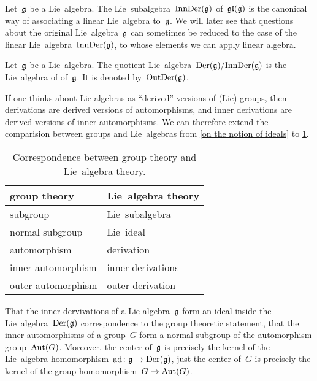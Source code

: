 \begin{remark}
  Let~$\mathfrak{g}$ be a Lie~algebra.
  The Lie~subalgebra~$\operatorname{InnDer}(\mathfrak{g})$ of~$\mathfrak{gl}(\mathfrak{g})$ is the canonical way of associating a linear Lie~algebra to~$\mathfrak{g}$.
  We will later see that questions about the original Lie~algebra~$\mathfrak{g}$ can sometimes be reduced to the case of the linear Lie~algebra~$\operatorname{InnDer}(\mathfrak{g})$, to whose elements we can apply linear algebra.
\end{remark}


\begin{definition}
  Let~$\mathfrak{g}$ be a Lie~algebra.
  The quotient Lie~algebra~$\operatorname{Der}(\mathfrak{g}) / {\operatorname{InnDer}(\mathfrak{g})}$ is the Lie~algebra of  of~$\mathfrak{g}$.
  It is denoted by~$\operatorname{OutDer}(\mathfrak{g})$.
\end{definition}


\begin{remark}
  If one thinks about Lie algebras as \enquote{derived} versions of (Lie) groups, then derivations are derived versions of automorphisms, and inner derivations are derived versions of inner automorphisms.
  We can therefore extend the comparision between groups and Lie~algebras from \cref{on the notion of ideals} to \cref{correspondence between groups and lie algebras}.
  \begin{table}
    \centering
    \begin{tabular}{ll}
      \toprule
      group theory
      &
      Lie~algebra theory
      \\
      \midrule
      subgroup
      &
      Lie~subalgebra
      \\
      normal subgroup
      &
      Lie~ideal
      \\
      automorphism
      &
      derivation
      \\
      inner automorphism
      &
      inner derivations
      \\
      outer automorphism
      &
      outer derivation
      \\
      \bottomrule
    \end{tabular}
    \caption{Correspondence between group theory and Lie~algebra theory.}
    \label{correspondence between groups and lie algebras}
  \end{table}

  That the inner dervivations of a Lie algebra~$\mathfrak{g}$ form an ideal inside the Lie~algebra~$\operatorname{Der}(\mathfrak{g})$ correspondence to the group theoretic statement, that the inner automorphisms of a group~$G$ form a normal subgroup of the automorphism group~$\operatorname{Aut}(G)$.
  Moreover, the center of~$\mathfrak{g}$ is precisely the kernel of the Lie~algebra homomorphism~$\ad \colon \glie \to \Der(\glie)$, just the center of~$G$ is precisely the kernel of the group homomorphism~$G \to \Aut(G)$.
\end{remark}



